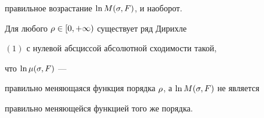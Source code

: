 правильное возрастание $\ln M(\sigma,F)$, и наоборот.





\begin{assrt}


Для любого $\rho\in[0,+\infty)$ существует ряд Дирихле


$(1)$ с нулевой абсциссой абсолютной сходимости такой, 


что $\ln \mu(\sigma,F)$ ---


правильно меняющаяся функция порядка $\rho$, а $\ln M(\sigma,F)$ не является


правильно меняющейся функцией того же порядка.


\end{assrt}





